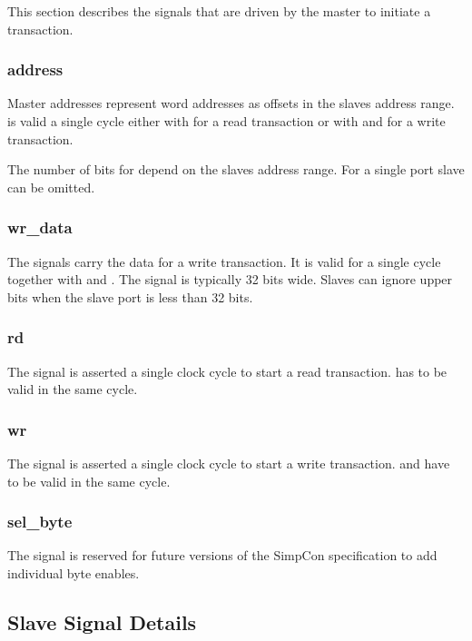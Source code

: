 This section describes the signals that are driven by the master to
initiate a transaction.

\subsubsection{address}

Master addresses represent word addresses as offsets in the slaves
address range.  is valid a single cycle either with
 for a read transaction or with  and
 for a write transaction.

The number of bits for  depend on the slaves address
range. For a single port slave  can be omitted.

\subsubsection{wr\_data}

The  signals carry the data for a write transaction.
It is valid for a single cycle together with  and
. The signal is typically 32 bits wide. Slaves can ignore
upper bits when the slave port is less than 32 bits.

\subsubsection{rd}

The  signal is asserted a single clock cycle to start a
read transaction.  has to be valid in the same cycle.

\subsubsection{wr}

The  signal is asserted a single clock cycle to start a
write transaction.  and  have to be
valid in the same cycle.

\subsubsection{sel\_byte}

The  signal is reserved for future versions of the
SimpCon specification to add individual byte enables.

\subsection{Slave Signal Details}

